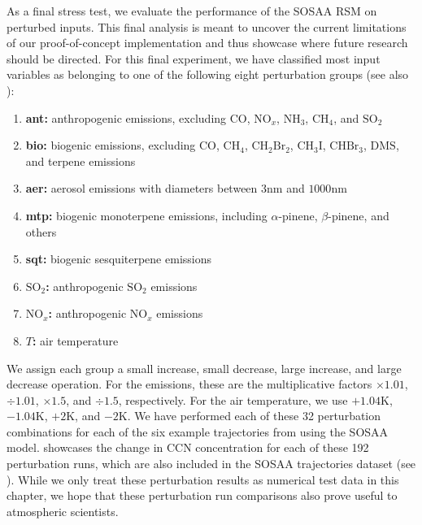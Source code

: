 As a final stress test, we evaluate the performance of the SOSAA RSM on perturbed inputs. This final analysis is meant to uncover the current limitations of our proof-of-concept implementation and thus showcase where future research should be directed. For this final experiment, we have classified most input variables as belonging to one of the following eight perturbation groups (see also ):
\begin{enumerate}
    \item \textbf{ant:} anthropogenic emissions, excluding $\text{CO}$, $\text{NO}_{x}$, $\text{NH}_3$, $\text{CH}_4$, and $\text{SO}_2$
    \item \textbf{bio:} biogenic emissions, excluding $\text{CO}$, $\text{CH}_4$, $\text{CH}_2\text{Br}_2$, $\text{CH}_3\text{I}$, $\text{CHBr}_3$, $\text{DMS}$, and terpene emissions
    \item \textbf{aer:} aerosol emissions with diameters between $3\text{nm}$ and $1000\text{nm}$
    \item \textbf{mtp:} biogenic monoterpene emissions, including $\alpha$-pinene, $\beta$-pinene, and others
    \item \textbf{sqt:} biogenic sesquiterpene emissions
    \item \textbf{$\text{SO}_2$:} anthropogenic $\text{SO}_2$ emissions
    \item \textbf{$\text{NO}_{x}$:} anthropogenic $\text{NO}_{x}$ emissions
    \item \textbf{$T$:} air temperature
\end{enumerate}
\noindent We assign each group a small increase, small decrease, large increase, and large decrease operation. For the emissions, these are the multiplicative factors $\times 1.01$, $\div 1.01$, $\times 1.5$, and $\div 1.5$, respectively. For the air temperature, we use $+1.04\text{K}$, $-1.04\text{K}$, $+2\text{K}$, and $-2\text{K}$. We have performed each of these 32 perturbation combinations for each of the six example trajectories from  using the SOSAA model.  showcases the change in CCN concentration for each of these 192 perturbation runs, which are also included in the SOSAA trajectories dataset (see ). While we only treat these perturbation results as numerical test data in this chapter, we hope that these perturbation run comparisons also prove useful to atmospheric scientists.

